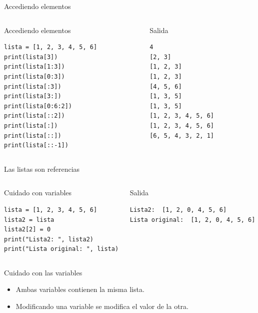 \documentclass[bigger,unknownkeysallowed]{beamer}
\begin{document}
\begin{frame}[fragile,label={sec:org60ef1d6}]{Accediendo elementos}
 \begin{columns}[t]
\begin{column}{0.5\columnwidth}
\begin{exampleblock}{Accediendo elementos}
\begin{verbatim}
lista = [1, 2, 3, 4, 5, 6]
print(lista[3])
print(lista[1:3])
print(lista[0:3])
print(lista[:3])
print(lista[3:])
print(lista[0:6:2])
print(lista[::2])
print(lista[:])
print(lista[::])
print(lista[::-1])
\end{verbatim}
\end{exampleblock}
\end{column}
\begin{column}{0.5\columnwidth}
\begin{block}{Salida}
\scriptsize
\begin{verbatim}
4
[2, 3]
[1, 2, 3]
[1, 2, 3]
[4, 5, 6]
[1, 3, 5]
[1, 3, 5]
[1, 2, 3, 4, 5, 6]
[1, 2, 3, 4, 5, 6]
[6, 5, 4, 3, 2, 1]
\end{verbatim}
\end{block}
\end{column}
\end{columns}
\end{frame}
\begin{frame}[fragile,label={sec:org2efa836}]{Las listas son referencias}
 \begin{columns}[t]
\begin{column}{0.52\columnwidth}
\begin{exampleblock}{Cuidado con variables}
\begin{verbatim}
lista = [1, 2, 3, 4, 5, 6]
lista2 = lista
lista2[2] = 0
print("Lista2: ", lista2)
print("Lista original: ", lista)
\end{verbatim}
\end{exampleblock}
\end{column}

\begin{column}{0.48\columnwidth}
\begin{block}{Salida}
\scriptsize
\begin{verbatim}
Lista2:  [1, 2, 0, 4, 5, 6]
Lista original:  [1, 2, 0, 4, 5, 6]
\end{verbatim}
\end{block}
\end{column}
\end{columns}

\begin{alertblock}{Cuidado con las variables}
\begin{itemize}
\item Ambas variables contienen la misma lista.

\item Modificando una variable se modifica el valor de la otra.
\end{itemize}
\end{alertblock}
\end{frame}
\end{document}
